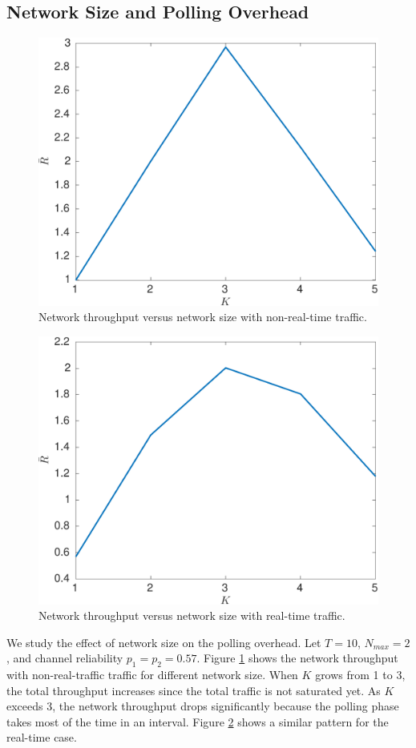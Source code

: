\documentclass{article}
\begin{document}
\subsection{Network Size and Polling Overhead}
\begin{figure}[htbp]
\centering
\includegraphics[width=.6\textwidth]{nonrealtime_throughput_K.pdf}
\caption{Network throughput versus network size with non-real-time traffic.}
\label{nonrealtime_throughput_K}
\end{figure}

\begin{figure}[htbp]
\centering
\includegraphics[width=.6\textwidth]{realtime_throughput_K.pdf}
\caption{Network throughput versus network size with real-time traffic.}
\label{realtime_throughput_K}
\end{figure}
We study the effect of network size on the polling overhead. Let $T = 10$, $N_{max}=2$, and channel reliability $p_1 = p_2 = 0.57$. Figure \ref{nonrealtime_throughput_K} shows the network throughput with non-real-traffic traffic for different network size. When $K$ grows from 1 to 3, the total throughput increases since the total traffic is not saturated yet. As $K$ exceeds 3, the network throughput drops significantly because the polling phase takes most of the time in an interval. Figure \ref{realtime_throughput_K} shows a similar pattern for the real-time case. 
\end{document}
